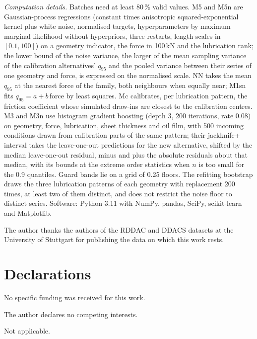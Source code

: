 \documentclass[pdflatex,sn-basic,lineno]{sn-jnl}
\begin{document}
\begin{appendices}
\emph{Computation details.} Batches need at least 80\,\% valid values. M5 and M5n are Gaussian-process regressions (constant times anisotropic squared-exponential kernel plus white noise, normalised targets, hyperparameters by maximum marginal likelihood without hyperpriors, three restarts, length scales in $[0.1, 100]$) on a geometry indicator, the force in 100\,kN and the lubrication rank; the lower bound of the noise variance, the larger of the mean sampling variance of the calibration alternatives' $q_{95}$ and the pooled variance between their series of one geometry and force, is expressed on the normalised scale. NN takes the mean $q_{95}$ at the nearest force of the family, both neighbours when equally near; M1sn fits $q_{95}=a+b\,$force by least squares. Mc calibrates, per lubrication pattern, the friction coefficient whose simulated draw-ins are closest to the calibration centres. M3 and M3n use histogram gradient boosting (depth 3, 200 iterations, rate 0.08) on geometry, force, lubrication, sheet thickness and oil film, with 500 incoming conditions drawn from calibration parts of the same pattern; their jackknife+ interval takes the leave-one-out predictions for the new alternative, shifted by the median leave-one-out residual, minus and plus the absolute residuals about that median, with its bounds at the extreme order statistics when $n$ is too small for the 0.9 quantiles. Guard bands lie on a grid of 0.25 floors. The refitting bootstrap draws the three lubrication patterns of each geometry with replacement 200 times, at least two of them distinct, and does not restrict the noise floor to distinct series. Software: Python 3.11 with NumPy, pandas, SciPy, scikit-learn \citep{pedregosa2011scikit} and Matplotlib.

\end{appendices}

\backmatter

The author thanks the authors of the RDDAC and DDACS datasets at the University of Stuttgart for publishing the data on which this work rests.

\section*{Declarations}

No specific funding was received for this work.

The author declares no competing interests.

Not applicable.
\end{document}
